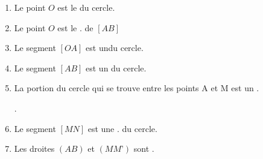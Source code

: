\documentclass[a4paper,10pt]{report}
\begin{document}
\begin{ex}
\begin{minipage}{5cm}
\begin{tikzpicture}[line cap=round,line join=round,>=triangle 45,x=1.0cm,y=1.0cm,scale=1.2]
\end{tikzpicture}
\end{minipage}
\hspace{5mm}
\begin{minipage}{11cm}
\begin{enumerate}
\item Le point $O$ est le \dotfill du cercle.\medskip
\item Le point $O$ est le \dotfill. de $[AB]$\medskip
\item Le segment $[OA]$ est un\dotfill du cercle.\medskip
\item Le segment $[AB]$ est un \dotfill du cercle.\medskip
\item La portion du cercle qui se trouve entre les points A et M est un \dotfill.\medskip

\dotfill.\medskip
\item Le segment $[MN]$ est une \dotfill. du cercle.\medskip
\item Les droites $(AB)$ et $(MM’)$ sont \dotfill.
\end{enumerate}
\end{minipage}
\end{ex}
\end{document}

